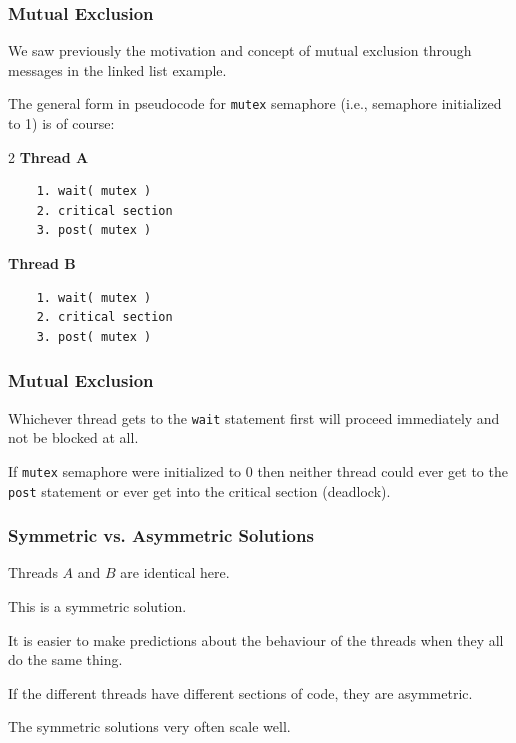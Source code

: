 \begin{frame}[fragile]
	\frametitle{Mutual Exclusion}

	We saw previously the motivation and concept of mutual exclusion through messages in the linked list example.

	The general form in pseudocode for \texttt{mutex} semaphore (i.e., semaphore initialized to 1) is of course:

	\begin{multicols}{2}
		\textbf{Thread A}
		\begin{verbatim}
	1. wait( mutex )
	2. critical section
	3. post( mutex )
  \end{verbatim}
		\columnbreak
		\textbf{Thread B}\vspace{-2em}
		\begin{verbatim}
	1. wait( mutex )
	2. critical section
	3. post( mutex )
  		\end{verbatim}
	\end{multicols}
	\vspace{-2em}


\end{frame}

\begin{frame}
	\frametitle{Mutual Exclusion}

	Whichever thread gets to the \texttt{wait} statement first will proceed immediately and not be blocked at all.

	If \texttt{mutex} semaphore were initialized to 0 then neither thread could ever get to the \texttt{post} statement or ever get into the critical section (deadlock).


\end{frame}

\begin{frame}
	\frametitle{Symmetric vs. Asymmetric Solutions}

	Threads $A$ and $B$ are identical here.

	This is a \alert{symmetric} solution.

	It is easier to make predictions about the behaviour of the threads when they all do the same thing.

	If the different threads have different sections of code, they are \alert{asymmetric}.

	The symmetric solutions very often scale well.


\end{frame}

